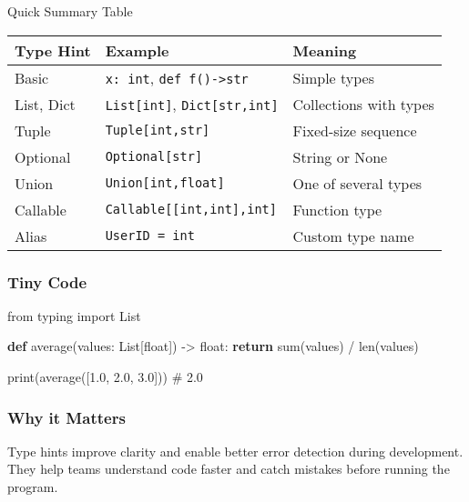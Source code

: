 \documentclass[
  letterpaper,
  DIV=11,
  numbers=noendperiod]{scrreprt}
\newenvironment{Shaded}{\begin{snugshade}}{\end{snugshade}}
\newcommand{\BuiltInTok}[1]{\textcolor[rgb]{0.00,0.23,0.31}{#1}}
\newcommand{\CommentTok}[1]{\textcolor[rgb]{0.37,0.37,0.37}{#1}}
\newcommand{\ControlFlowTok}[1]{\textcolor[rgb]{0.00,0.23,0.31}{\textbf{#1}}}
\newcommand{\FloatTok}[1]{\textcolor[rgb]{0.68,0.00,0.00}{#1}}
\newcommand{\ImportTok}[1]{\textcolor[rgb]{0.00,0.46,0.62}{#1}}
\newcommand{\KeywordTok}[1]{\textcolor[rgb]{0.00,0.23,0.31}{\textbf{#1}}}
\newcommand{\NormalTok}[1]{\textcolor[rgb]{0.00,0.23,0.31}{#1}}
\newcommand{\OperatorTok}[1]{\textcolor[rgb]{0.37,0.37,0.37}{#1}}
\begin{document}
Quick Summary Table

\begin{longtable}[]{@{}lll@{}}
\toprule\noalign{}
Type Hint & Example & Meaning \\
\midrule\noalign{}
\endhead
\bottomrule\noalign{}
\endlastfoot
Basic & \texttt{x:\ int}, \texttt{def\ f()-\textgreater{}str} & Simple
types \\
List, Dict & \texttt{List{[}int{]}}, \texttt{Dict{[}str,int{]}} &
Collections with types \\
Tuple & \texttt{Tuple{[}int,str{]}} & Fixed-size sequence \\
Optional & \texttt{Optional{[}str{]}} & String or None \\
Union & \texttt{Union{[}int,float{]}} & One of several types \\
Callable & \texttt{Callable{[}{[}int,int{]},int{]}} & Function type \\
Alias & \texttt{UserID\ =\ int} & Custom type name \\
\end{longtable}

\subsubsection{Tiny Code}\label{tiny-code-89}

\begin{Shaded}
\begin{Highlighting}[]
\ImportTok{from}\NormalTok{ typing }\ImportTok{import}\NormalTok{ List}

\KeywordTok{def}\NormalTok{ average(values: List[}\BuiltInTok{float}\NormalTok{]) }\OperatorTok{{-}\textgreater{}} \BuiltInTok{float}\NormalTok{:}
    \ControlFlowTok{return} \BuiltInTok{sum}\NormalTok{(values) }\OperatorTok{/} \BuiltInTok{len}\NormalTok{(values)}

\BuiltInTok{print}\NormalTok{(average([}\FloatTok{1.0}\NormalTok{, }\FloatTok{2.0}\NormalTok{, }\FloatTok{3.0}\NormalTok{]))  }\CommentTok{\# 2.0}
\end{Highlighting}
\end{Shaded}

\subsubsection{Why it Matters}\label{why-it-matters-89}

Type hints improve clarity and enable better error detection during
development. They help teams understand code faster and catch mistakes
before running the program.
\end{document}
